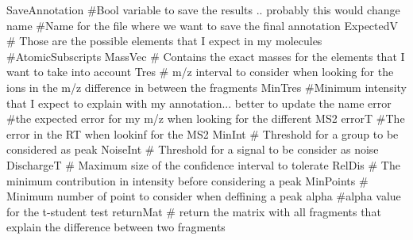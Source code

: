 SaveAnnotation #Bool variable to save the results .. probably this would change
name #Name for the file where we want to save the final annotation
ExpectedV # Those are the possible elements that I expect in my molecules #AtomicSubscripts
MassVec # Contains the exact masses for the elements that I want to take into account
Tres # m/z interval to consider when looking for the ions in the m/z difference in between the fragments
MinTres #Minimum intensity that I expect to explain with my annotation... better to update the name
error #the expected error for my m/z when looking for the different MS2
errorT #The error in the RT when lookinf for the MS2
MinInt # Threshold for a group to be considered as peak
NoiseInt # Threshold for a signal to be consider as noise
DischargeT # Maximum size of the confidence interval to tolerate
RelDis # The minimum contribution in intensity before considering a peak
MinPoints # Minimum number of point to consider when deffining a peak
alpha #alpha value for the t-student test
returnMat # return the matrix with all fragments that explain the difference between two fragments

